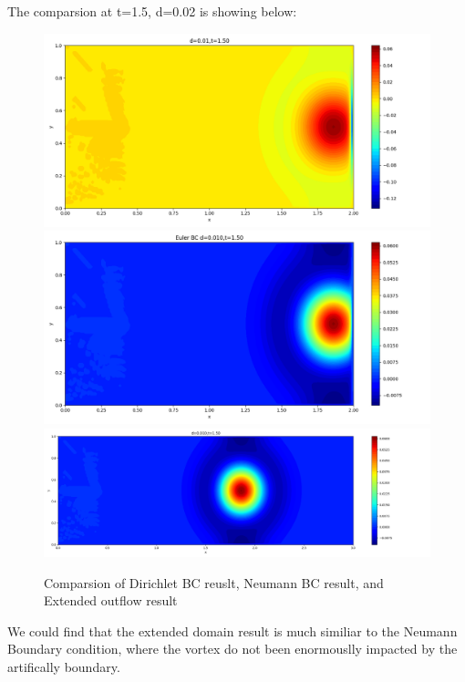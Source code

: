 \documentclass[12pt]{article}
\begin{document}



The comparsion at t=1.5, d=0.02 is showing below:
\begin{figure}[H]
    \includegraphics[width=0.6\linewidth]{figures/3d0.01t1.50.png}\\
    \includegraphics[width=0.6\linewidth]{figures/3Ed0.010t1.50.png}\\
    \includegraphics[width=0.9\linewidth]{figures6/6d0.010t1.50.png}
    \label{IGs.jpg}
    \caption{Comparsion of Dirichlet BC reuslt, Neumann BC result, and Extended outflow result}
\end{figure}

We could find that the extended domain result is much similiar
to the Neumann Boundary condition, where the vortex do not been
enormouslly impacted by the artifically boundary.\\
\end{document}
